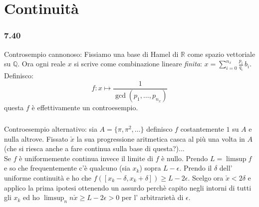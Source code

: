 \documentclass[a4paper,11pt]{article}
\newcommand{\ex}[1]{\subsubsection*{#1}}
\newcommand{\QQ}{\mathbb{Q}}
\newcommand{\RR}{\mathbb{R}}
\begin{document}
\section{Continuità}
\ex{7.40}Controsempio cannonoso: Fissiamo una base di Hamel di $\RR$ come spazio vettoriale su $\QQ$. Ora ogni reale $x$ si scrive come combinazione lineare {\it finita}: $x=\sum_{i=0}^{n_x} \frac{p_i}{q_i}\, b_i$. Definisco:
$$
f:x\mapsto \frac{1}{\gcd(p_1,\ldots,p_{n_x})}
$$ 
questa $f$ è effettivamente un controesempio.\\
\ex{}
Controesempio alternativo: sia $A=\{\pi,\pi^2,\ldots\}$ definisco $f$ costantemente $1$ su $A$ e nulla altrove. Fissato $\check{x}$ la sua progressione aritmetica casca al più una volta in $A$ (che si riesca anche a fare continua sulla base di questa?)...\\
Se $f$ è uniformemente continua invece il limite di $f$ è nullo. Prendo $L=\limsup f$ e so che frequentemente c'è qualcuno (sia $x_k$) sopra $L-\epsilon$. Prendo il $\delta$ dell' uniforme continuità e ho che $f([x_k-\delta,x_k+\delta])\ge L-2\epsilon$. Scelgo ora $\check{x}<2\delta$ e applico la prima ipotesi ottenendo un assurdo perchè capito negli intorni di tutti gli $x_k$ ed ho $\limsup_n n\check{x}\ge L-2\epsilon>0$ per l' arbitrarietà di $\epsilon$.
 
\end{document}
